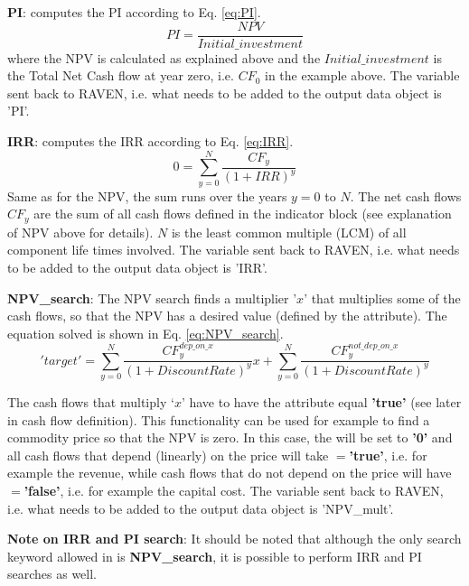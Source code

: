 \begin{enumerate}
\begin{enumerate}
\textbf{PI}: computes the PI according to Eq. \ref{eq:PI}. 
\begin{equation}\label{eq:PI}
PI=\frac{NPV}{Initial\_investment}
\end{equation}
where the NPV is calculated as explained above and the $Initial\_investment$ is the Total Net Cash flow at year zero, i.e. $CF_{0}$ in the example above.
The variable sent back to RAVEN, i.e. what needs to be added to the output data object is 'PI'.

\textbf{IRR}: computes the IRR according to Eq. \ref{eq:IRR}.
\begin{equation}\label{eq:IRR}
0=\sum_{y=0}^{N}\frac{CF_{y}}{(1+IRR)^{y}}
\end{equation}
Same as for the NPV, the sum runs over the years $y=0$ to $N$. The net cash flows $CF_{y}$ are the sum of all cash flows defined in the indicator block 
(see explanation of NPV above for details). $N$ is the least common multiple (LCM) of all component life times involved.
The variable sent back to RAVEN, i.e. what needs to be added to the output data object is 'IRR'.

\textbf{NPV\_search}: The NPV search finds a multiplier '$x$' that multiplies some of the cash flows, so that the NPV has a desired value (defined by the  attribute). The equation solved is shown in Eq. \ref{eq:NPV_search}.
\label{subsec:NPV_search}
\begin{equation}\label{eq:NPV_search}
'target'=\sum_{y=0}^{N}\frac{CF^{dep\_on\_x}_{y}}{(1+DiscountRate)^{y}}x + \sum_{y=0}^{N}\frac{CF^{not\_dep\_on\_x}_{y}}{(1+DiscountRate)^{y}}  
\end{equation}

The cash flows that multiply ‘$x$’ have to have the  attribute equal \textbf{'true'} (see later in cash flow definition). This functionality can be used for
 example to find a commodity price so that the NPV is zero. In this case, the  will be set to \textbf{'0'} and all cash flows that depend (linearly) on the price will take
 $=$\textbf{'true'}, i.e. for example the revenue, while cash flows that do not depend on the price will have $=$\textbf{'false'}, i.e. for example the capital cost.
The variable sent back to RAVEN, i.e. what needs to be added to the output data object is 'NPV\_mult'.

\textbf{Note on IRR and PI search}: It should be noted that although the only search keyword allowed in  is \textbf{NPV\_search}, it is possible to perform IRR and PI searches as well.


\end{enumerate}
\end{enumerate}
